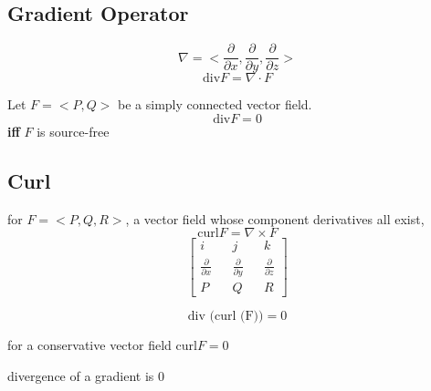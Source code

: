 \subsection{Gradient Operator}
\begin{equation}
	\label{}

\nabla=<\frac{\partial}{\partial x},\frac{\partial}{\partial y},\frac{\partial}{\partial z}>
\end{equation}
\begin{equation}
	\label{}
	\mbox{div}F=\nabla \cdot F	
\end{equation}

Let $F=<P,Q>$ be a simply connected vector field.
\begin{equation}
	\label{}
	\mbox{div}F=0	
\end{equation}
\textbf{iff} $F$ is source-free

\subsection{Curl}
for $F=<P,Q,R>$, a vector field whose component derivatives all exist,
\begin{equation}
	\label{}
	\mbox{curl}F=\nabla \times  F	
\end{equation}
\begin{equation}
	\label{}
\begin{bmatrix}
	i&&j&&k\\
	\frac{\partial}{\partial x}&&\frac{\partial}{\partial y}&&\frac{\partial}{\partial z}\\
	P&&Q&&R
\end{bmatrix}	
\end{equation}

\begin{equation}
	\label{}
	\mbox{div (curl (F))}=0	
\end{equation}

for a conservative vector field curl$F=0$


divergence of a gradient is 0
 

